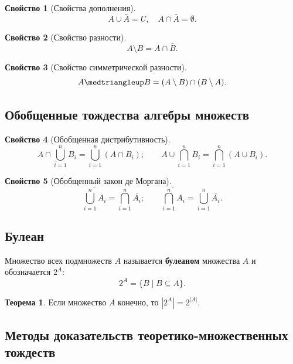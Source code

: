 \documentclass[a5paper, 11pt]{extarticle}
\theoremstyle{definition}
\newtheorem*{theorem*}{Теорема}
\newtheorem{property}{Свойство}[subsection]
\theoremstyle{definition}
\theoremstyle{definition}
\numberwithin{figure}{section}
\numberwithin{table}{section}
\newcommand{\symdiff}{\medtriangleup}
\begin{document}
\begin{property}[Свойства дополнения]
    \[
        A \cup \bar{A} = U,
        \quad
        A \cap \bar{A} = \emptyset.
    \]
\end{property}

\begin{property}[Свойство разности]
    \[
        A \setminus B = A \cap \bar{B}.
    \]
\end{property}

\begin{property}[Свойство симметрической разности]
    \[
        A \symdiff B = (A \setminus B) \cap (B \setminus A).
    \]
\end{property}

\subsection{Обобщенные тождества алгебры множеств}

\begin{property}[Обобщенная дистрибутивность]
    \[
        A \cap \bigcup_{i = 1}^n B_i = \bigcup_{i = 1}^n (A \cap B_i);
        \qquad
        A \cup \bigcap_{i = 1}^n B_i = \bigcap_{i = 1}^n (A \cup B_i).
    \]
\end{property}

\begin{property}[Обобщенный закон де Моргана]
    \[
        \overline{\bigcup_{i = 1}^n A_i} = \bigcap_{i = 1}^n \overline{A_i};
        \qquad
        \overline{\bigcap_{i = 1}^n A_i} = \bigcup_{i = 1}^n \overline{A_i}.
    \]
\end{property}

\subsection{Булеан}

Множество всех подмножеств \(A\) называется \textbf{булеаном} множества \(A\) и обозначается \(2^A\):
\[
    2^A = \{B \mid B \subseteq A\}.
\]

\begin{theorem*}
    Если множество \(A\) конечно, то \(|2^A| = 2^{|A|}\).
\end{theorem*}

\subsection{Методы доказательств теоретико-множественных тождеств}
\end{document}
